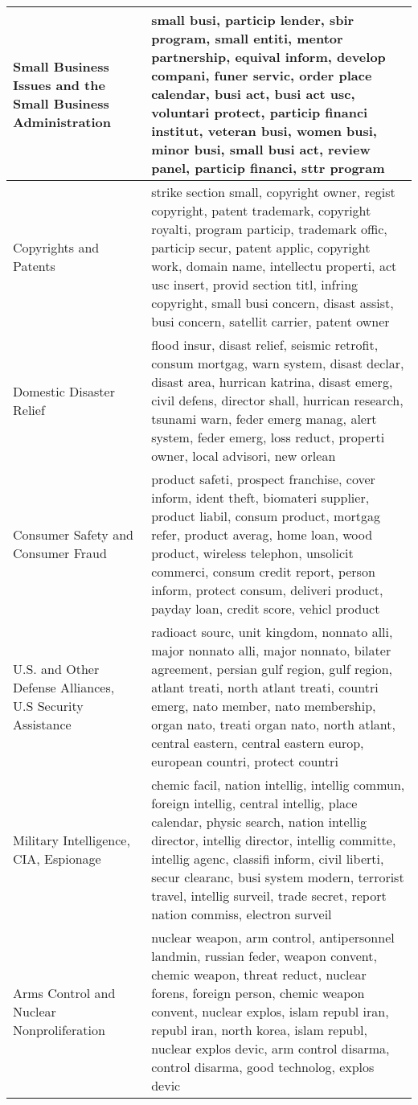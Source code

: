 \begin{longtable}{p{}p{}}
   \hline
Small Business Issues and the Small Business Administration & small busi, particip lender, sbir program, small entiti, mentor partnership, equival inform, develop compani, funer servic, order place calendar, busi act, busi act usc, voluntari protect, particip financi institut, veteran busi, women busi, minor busi, small busi act, review panel, particip financi, sttr program \\ 
   \hline
Copyrights and Patents & strike section small, copyright owner, regist copyright, patent trademark, copyright royalti, program particip, trademark offic, particip secur, patent applic, copyright work, domain name, intellectu properti, act usc insert, provid section titl, infring copyright, small busi concern, disast assist, busi concern, satellit carrier, patent owner \\ 
   \hline
Domestic Disaster Relief & flood insur, disast relief, seismic retrofit, consum mortgag, warn system, disast declar, disast area, hurrican katrina, disast emerg, civil defens, director shall, hurrican research, tsunami warn, feder emerg manag, alert system, feder emerg, loss reduct, properti owner, local advisori, new orlean \\ 
   \hline
Consumer Safety and Consumer Fraud & product safeti, prospect franchise, cover inform, ident theft, biomateri supplier, product liabil, consum product, mortgag refer, product averag, home loan, wood product, wireless telephon, unsolicit commerci, consum credit report, person inform, protect consum, deliveri product, payday loan, credit score, vehicl product \\ 
   \hline
U.S. and Other Defense Alliances, U.S Security Assistance & radioact sourc, unit kingdom, nonnato alli, major nonnato alli, major nonnato, bilater agreement, persian gulf region, gulf region, atlant treati, north atlant treati, countri emerg, nato member, nato membership, organ nato, treati organ nato, north atlant, central eastern, central eastern europ, european countri, protect countri \\ 
   \hline
Military Intelligence, CIA, Espionage & chemic facil, nation intellig, intellig commun, foreign intellig, central intellig, place calendar, physic search, nation intellig director, intellig director, intellig committe, intellig agenc, classifi inform, civil liberti, secur clearanc, busi system modern, terrorist travel, intellig surveil, trade secret, report nation commiss, electron surveil \\ 
   \hline
Arms Control and Nuclear Nonproliferation & nuclear weapon, arm control, antipersonnel landmin, russian feder, weapon convent, chemic weapon, threat reduct, nuclear forens, foreign person, chemic weapon convent, nuclear explos, islam republ iran, republ iran, north korea, islam republ, nuclear explos devic, arm control disarma, control disarma, good technolog, explos devic \\ 

\end{longtable}
